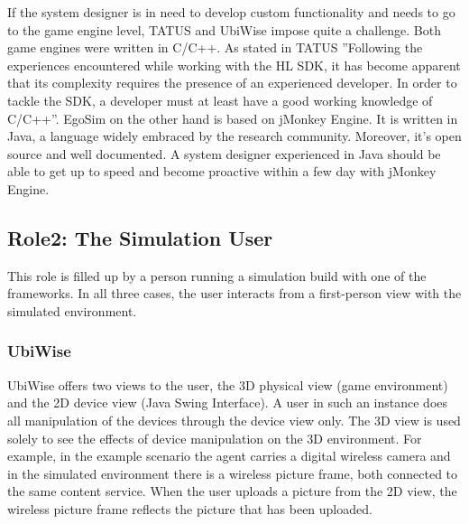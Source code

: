 If the system designer is in need to develop custom functionality and needs to go to the game engine level, TATUS and UbiWise impose quite a challenge. Both game engines were written in C/C++. As stated in TATUS ''Following the experiences encountered while working with the HL SDK, it has become apparent that its complexity requires the presence of an experienced developer. In order to tackle the SDK, a developer must at least have a good working knowledge of C/C++''. EgoSim on the other hand is based on jMonkey Engine. It is written in Java, a language widely embraced by the research community. Moreover, it's open source and well documented. A system designer experienced in Java should be able to get up to speed and become proactive within a few day with jMonkey Engine.\\

\subsection{Role2: The Simulation User} %
\label{subsec:eval_role_simulation_user}
This role is filled up by a person running a simulation build with one of the frameworks. In all three cases, the user interacts from a first-person view with the simulated environment.\\

\subsubsection{UbiWise} %
UbiWise offers two views to the user, the 3D physical view (game environment) and the 2D device view (Java Swing Interface). A user in such an instance does all manipulation of the devices through the device view only. The 3D view is used solely to see the effects of device manipulation on the 3D environment. For example, in the example scenario the agent carries a digital wireless camera and in the simulated environment there is a wireless picture frame, both connected to the same content service. When the user uploads a picture from the 2D view, the wireless picture frame reflects the picture that has been uploaded.\\


